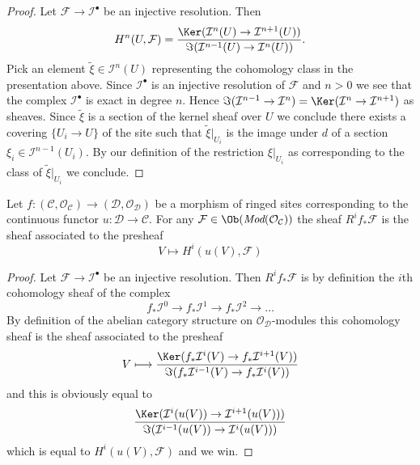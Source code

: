 \begin{proof}
Let $\mathcal{F} \to \mathcal{I}^\bullet$ be an injective resolution.
Then
$$
H^n(U, \mathcal{F}) =
\frac{\Ker(\mathcal{I}^n(U) \to \mathcal{I}^{n + 1}(U))}
{\Im(\mathcal{I}^{n - 1}(U) \to \mathcal{I}^n(U))}.
$$
Pick an element $\tilde \xi \in \mathcal{I}^n(U)$ representing the
cohomology class in the presentation above. Since $\mathcal{I}^\bullet$
is an injective resolution of $\mathcal{F}$ and $n > 0$ we see that
the complex $\mathcal{I}^\bullet$ is exact in degree $n$. Hence
$\Im(\mathcal{I}^{n - 1} \to \mathcal{I}^n) =
\Ker(\mathcal{I}^n \to \mathcal{I}^{n + 1})$ as sheaves.
Since $\tilde \xi$ is a section of the kernel sheaf over $U$
we conclude there exists a covering $\{U_i \to U\}$ of the site
such that $\tilde \xi|_{U_i}$ is the image under $d$ of a section
$\xi_i \in \mathcal{I}^{n - 1}(U_i)$. By our definition of the
restriction $\xi|_{U_i}$ as corresponding to the class of
$\tilde \xi|_{U_i}$ we conclude.
\end{proof}

\begin{lemma}
\label{lemma-higher-direct-images}
Let $f : (\mathcal{C}, \mathcal{O}_\mathcal{C}) \to
(\mathcal{D}, \mathcal{O}_\mathcal{D})$ be a morphism of ringed sites
corresponding to the continuous functor $u : \mathcal{D} \to \mathcal{C}$.
For any $\mathcal{F} \in \Ob(\textit{Mod}(\mathcal{O}_\mathcal{C}))$
the sheaf $R^if_*\mathcal{F}$ is the sheaf associated to the
presheaf
$$
V \longmapsto H^i(u(V), \mathcal{F})
$$
\end{lemma}

\begin{proof}
Let $\mathcal{F} \to \mathcal{I}^\bullet$ be an injective resolution.
Then $R^if_*\mathcal{F}$ is by definition the $i$th cohomology sheaf
of the complex
$$
f_*\mathcal{I}^0 \to f_*\mathcal{I}^1 \to f_*\mathcal{I}^2 \to \ldots
$$
By definition of the abelian category structure on
$\mathcal{O}_\mathcal{D}$-modules
this cohomology sheaf is the sheaf associated to the presheaf
$$
V
\longmapsto
\frac{\Ker(f_*\mathcal{I}^i(V) \to f_*\mathcal{I}^{i + 1}(V))}
{\Im(f_*\mathcal{I}^{i - 1}(V) \to f_*\mathcal{I}^i(V))}
$$
and this is obviously equal to
$$
\frac{\Ker(\mathcal{I}^i(u(V)) \to \mathcal{I}^{i + 1}(u(V)))}
{\Im(\mathcal{I}^{i - 1}(u(V)) \to \mathcal{I}^i(u(V)))}
$$
which is equal to $H^i(u(V), \mathcal{F})$
and we win.
\end{proof}






